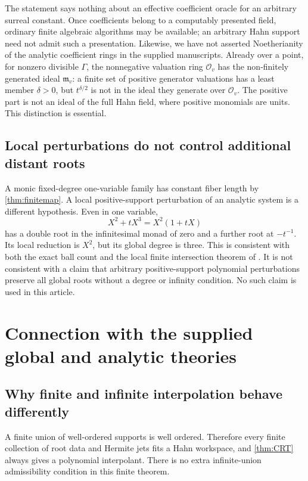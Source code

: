 \documentclass[11pt,letterpaper]{article}
\numberwithin{equation}{section}
\theoremstyle{definition}
\theoremstyle{remark}
\newcommand{\Ov}{\mathcal O_v}
\newcommand{\mv}{\mathfrak m_v}
\begin{document}
The statement says nothing about an effective coefficient oracle for an
arbitrary surreal constant. Once coefficients belong to a computably
presented field, ordinary finite algebraic algorithms may be available;
an arbitrary Hahn support need not admit such a presentation. Likewise,
we have not asserted Noetherianity of the analytic coefficient rings in
the supplied manuscripts. Already over a point, for nonzero divisible $\Gamma$, the nonnegative
valuation ring $\Ov$ has the non-finitely generated ideal $\mv$: a finite
set of positive generator valuations has a least member $\delta>0$, but
$t^{\delta/2}$ is not in the ideal they generate over $\Ov$. The positive
part is not an ideal of the full Hahn field, where positive monomials
are units. This distinction is essential.

\subsection{Local perturbations do not control additional distant roots}
A monic fixed-degree one-variable family has constant fiber length by
\cref{thm:finitemap}. A local positive-support perturbation of an analytic
system is a different hypothesis. Even in one variable,
\begin{equation}\label{eq:escapingroot}
 X^2+tX^3=X^2(1+tX)
\end{equation}
has a double root in the infinitesimal monad of zero and a further root at
$-t^{-1}$. Its local reduction is $X^2$, but its global degree is three.
This is consistent with both the exact ball count and the local finite
intersection theorem of \cite{SourceResearch}. It is not consistent with
a claim that arbitrary positive-support polynomial perturbations preserve
all global roots without a degree or infinity condition. No such claim
is used in this article.

\section{Connection with the supplied global and analytic theories}\label{sec:connections}

\subsection{Why finite and infinite interpolation behave differently}
A finite union of well-ordered supports is well ordered. Therefore every
finite collection of root data and Hermite jets fits a Hahn workspace,
and \cref{thm:CRT} always gives a polynomial interpolant. There is no
extra infinite-union admissibility condition in this finite theorem.
\end{document}
